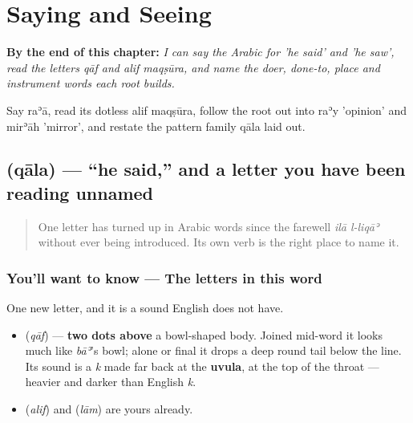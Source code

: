 
\chapter{Saying and Seeing}
\label{ch:ar-saying-and-seeing}

\begin{chapteropening}
\textbf{By the end of this chapter:} \emph{I can say the Arabic for 'he said' and 'he saw', read the letters qāf and alif maqṣūra, and name the doer, done-to, place and instrument words each root builds.}

Say raʾā, read its dotless alif maqṣūra, follow the root out into raʾy 'opinion' and mirʾāh 'mirror', and restate the pattern family qāla laid out.
\end{chapteropening}

\section[\texorpdfstring{\ar{قال} (qāla)}{قال (qāla)}]{ (qāla) — \textquotedblleft{}he said,\textquotedblright{} and a letter you have been reading unnamed}

\label{lesson:AR-C29-qala}



\begin{quote}
One letter has turned up in Arabic words since the farewell \emph{ilā l-liqāʾ} without ever being introduced. Its own verb is the right place to name it.
\end{quote}

\subsection*{You'll want to know — The letters in this word}
One new letter, and it is a sound English does not have.

\begin{itemize}
\raggedright
  \item \textbf{} (\emph{qāf}) — \textbf{two dots above} a bowl-shaped body. Joined mid-word it looks much like \emph{bāʾ}'s bowl; alone or final it drops a deep round tail below the line. Its sound is a \emph{k} made far back at the \textbf{uvula}, at the top of the throat — heavier and darker than English \emph{k}.
  \item \textbf{} (\emph{alif}) and \textbf{} (\emph{lām}) are yours already.
\end{itemize}


